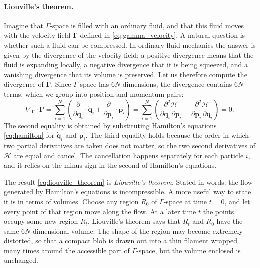 \documentclass[12pt]{article}
\renewcommand{\vec}[1]{\bm{#1}}
\begin{document}
\paragraph{Liouville's theorem.}  Imagine that $\Gamma$-space is filled
with an ordinary fluid, and that this fluid moves with the velocity
field $\dot{\vec\Gamma}$ defined in \eqref{eq:gamma_velocity}.  A
natural question is whether such a fluid can be compressed.  In
ordinary fluid mechanics the answer is given by the divergence of the
velocity field: a positive divergence means that the fluid is expanding
locally, a negative divergence that it is being squeezed, and a
vanishing divergence that its volume is preserved.  Let us therefore
compute the divergence of $\dot{\vec\Gamma}$.  Since $\Gamma$-space has
$6N$ dimensions, the divergence contains $6N$ terms, which we group
into position and momentum pairs:
%
\begin{equation}
  \nabla_{\!\vec\Gamma}\!\cdot\!\dot{\vec\Gamma}
   = \sum_{i=1}^{N}\!\left(
       \frac{\partial}{\partial\vec q_i}\!\cdot\!\dot{\vec q}_i
     + \frac{\partial}{\partial\vec p_i}\!\cdot\!\dot{\vec p}_i\right)
   = \sum_{i=1}^{N}\!\left(
       \frac{\partial^2\mathcal H}{\partial\vec q_i\,\partial\vec p_i}
     - \frac{\partial^2\mathcal H}{\partial\vec p_i\,\partial\vec q_i}\right)
   = 0.
  \label{eq:liouville_theorem}
\end{equation}
%
The second equality is obtained by substituting Hamilton's equations
\eqref{eq:hamilton} for $\dot{\vec q}_i$ and $\dot{\vec p}_i$.  The
third equality holds because the order in which two partial derivatives
are taken does not matter, so the two second derivatives of
$\mathcal H$ are equal and cancel.  The cancellation happens
separately for each particle $i$, and it relies on the minus sign in
the second of Hamilton's equations.

The result \eqref{eq:liouville_theorem} is \emph{Liouville's theorem}.
Stated in words: the flow generated by Hamilton's equations is
incompressible.  A more useful way to state it is in terms of volumes.
Choose any region $R_0$ of $\Gamma$-space at time $t=0$, and let every
point of that region move along the flow.  At a later time $t$ the
points occupy some new region $R_t$.  Liouville's theorem says that
$R_t$ and $R_0$ have the same $6N$-dimensional volume.  The shape of
the region may become extremely distorted, so that a compact blob is
drawn out into a thin filament wrapped many times around the accessible
part of $\Gamma$-space, but the volume enclosed is unchanged.
\end{document}
